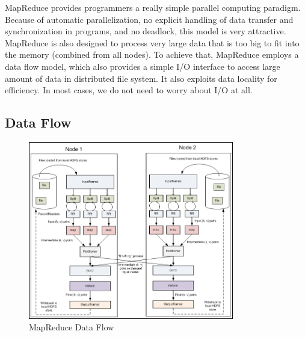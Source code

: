 \documentclass[12pt]{book}
\begin{document}
MapReduce provides programmers a really simple parallel computing paradigm. Because of automatic parallelization, no explicit handling of data transfer and synchronization in programs, and no deadlock, this model is very attractive. MapReduce is also designed to process very large data that is too big to fit into the memory (combined from all nodes). To achieve that, MapReduce employs a data flow model, which also provides a simple I/O interface to access large amount of data in distributed file system. It also exploits data locality for efficiency. In most cases, we do not need to worry about I/O at all.

\subsection{Data Flow}
\begin{figure}[t]
\includegraphics[width=0.8\textwidth]{images/MapReduce.png}
\centering
\caption{MapReduce Data Flow}
\end{figure}
\end{document}
